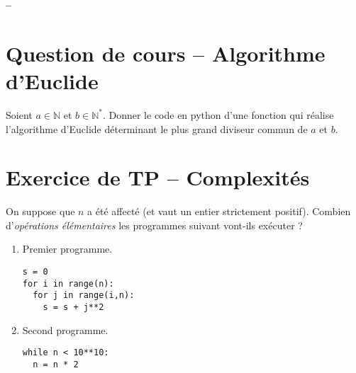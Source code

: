 





\begin{center}
{\Large\bf {\type} \no {\numero} -- \descrip}
\end{center}



\section{Question de cours -- Algorithme d'Euclide}

Soient $a \in \mathbb N$ et $b \in \mathbb N^*$. Donner le code en python d'une fonction qui réalise l'algorithme d'Euclide déterminant le plus grand diviseur commun de $a$ et $b$.

\section{Exercice de TP -- Complexités}

On suppose que $n$ a été affecté (et vaut un entier strictement positif). Combien d’\textit{opérations élémentaires} les programmes suivant vont-ils exécuter ?


\begin{enumerate}
\item Premier programme.

\begin{verbatim}
s = 0
for i in range(n):
  for j in range(i,n):
    s = s + j**2
\end{verbatim}


\item Second programme.

\begin{verbatim}
while n < 10**10:
  n = n * 2
\end{verbatim}
\end{enumerate}

